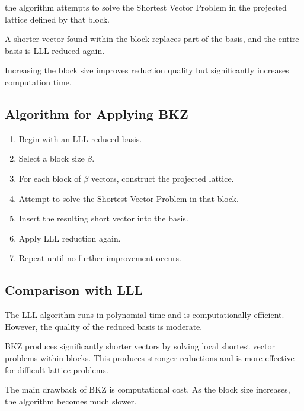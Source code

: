 \documentclass[12pt, a4paper]{article}
\theoremstyle{definition}
\theoremstyle{plain}
\begin{document}
the algorithm attempts to solve the Shortest Vector Problem in the projected lattice defined by that block.

A shorter vector found within the block replaces part of the basis, and the entire basis is LLL-reduced again.

Increasing the block size improves reduction quality but significantly increases computation time.

\subsection{Algorithm for Applying BKZ}

\begin{enumerate}

\item Begin with an LLL-reduced basis.

\item Select a block size $\beta$.

\item For each block of $\beta$ vectors, construct the projected lattice.

\item Attempt to solve the Shortest Vector Problem in that block.

\item Insert the resulting short vector into the basis.

\item Apply LLL reduction again.

\item Repeat until no further improvement occurs.

\end{enumerate}

\subsection{Comparison with LLL}

The LLL algorithm runs in polynomial time and is computationally efficient. However, the quality of the reduced basis is moderate.

BKZ produces significantly shorter vectors by solving local shortest vector problems within blocks. This produces stronger reductions and is more effective for difficult lattice problems.

The main drawback of BKZ is computational cost. As the block size increases, the algorithm becomes much slower.
\end{document}

